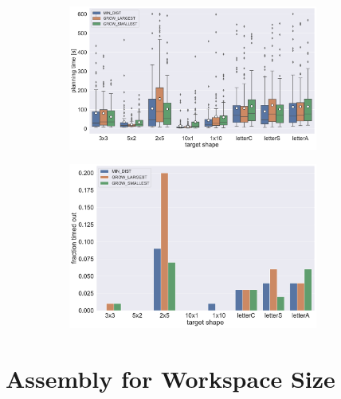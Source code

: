 \begin{figure}
	\centering
	\begin{subfigure}[b]{\textwidth}
		\centering
		\includegraphics[width=0.9\textwidth]{figures/plots/AFTS_time.pdf}
		\caption{}
		\label{fig:AFTS_time}
	\end{subfigure}
	
	\begin{subfigure}[b]{\textwidth}
		\centering
		\includegraphics[width=0.9\textwidth]{figures/plots/AFTS_timeout.pdf}
		\caption{}
		\label{fig:AFTS_timeout}
	\end{subfigure}
	\caption[]{}
	\label{fig:AFTS_timestats}
\end{figure}




\section{Assembly for Workspace Size}

